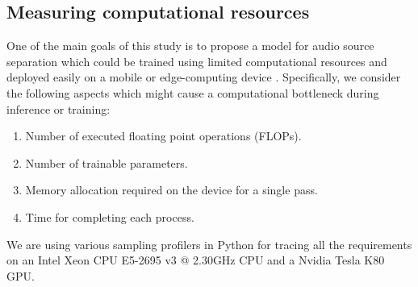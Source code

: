\documentclass{article}
\theoremstyle{definition}
\begin{document}
\subsection{Measuring computational resources}
\label{sec:exp_setup:computational_resources}
One of the main goals of this study is to propose a model for audio source separation which could be trained using limited computational resources and deployed easily on a mobile or edge-computing device  \cite{lane2016deepx_deeplearning_onmobiledevs}. Specifically, we consider the following aspects which might cause a computational bottleneck during inference or training:
\begin{enumerate}
    \item Number of executed floating point operations (FLOPs).
     \item Number of trainable parameters.
    \item Memory allocation required on the device for a single pass.
    \item Time for completing each process. 
\end{enumerate}
We are using various sampling profilers in Python for tracing all the requirements on an Intel Xeon CPU E5-2695 v3 @ 2.30GHz CPU and a Nvidia Tesla K80 GPU.
\end{document}
